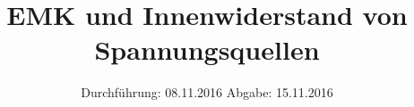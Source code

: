 

\subject{V301}
\title{EMK und Innenwiderstand von Spannungsquellen}
\date{
	Durchführung: 08.11.2016
	\hspace{4em}
	Abgabe: 15.11.2016
}


	\maketitle
	\newpage
	\tableofcontents
	\newpage
	
	
	
	\newpage
	
	
	\newpage
	
	\printbibliography

